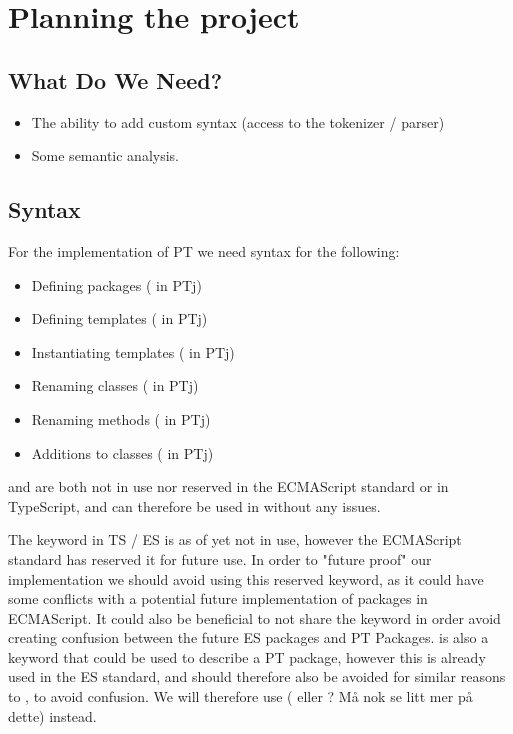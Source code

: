 
\chapter{Planning the project}\label{ch:planning-the-project}



\section{What Do We Need?}\label{sec:what-do-we-need}

\begin{itemize}
    \item The ability to add custom syntax (access to the tokenizer / parser)
    \item Some semantic analysis.
\end{itemize}

\section{Syntax}\label{sec:syntax}

For the implementation of PT we need syntax for the following:

\begin{itemize}
    \item Defining packages ( in PTj)
    \item Defining templates ( in PTj)
    \item Instantiating templates ( in PTj)
    \item Renaming classes (\codeword{=>} in PTj)
    \item Renaming methods (\codeword{->} in PTj)
    \item Additions to classes ( in PTj)
\end{itemize}

 and  are both not in use nor reserved in the ECMAScript standard or in TypeScript, and can therefore be used in \plname{} without any issues.

The keyword  in TS / ES is as of yet not in use, however the ECMAScript standard has reserved it for future use.
In order to "future proof" our implementation we should avoid using this reserved keyword, as it could have some conflicts with a potential future implementation of packages in ECMAScript.
It could also be beneficial to not share the keyword in order avoid creating confusion between the future ES packages and PT Packages.
 is also a keyword that could be used to describe a PT package, however this is already used in the ES standard, and should therefore also be avoided for similar reasons to , to avoid confusion.
We will therefore use ( eller ? Må nok se litt mer på dette) instead. %

